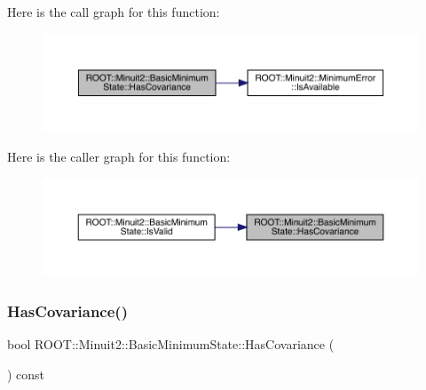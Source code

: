 Here is the call graph for this function\+:
\nopagebreak
\begin{figure}[H]
\begin{center}
\leavevmode
\includegraphics[width=350pt]{d0/db1/classROOT_1_1Minuit2_1_1BasicMinimumState_a9d43155058c576759d062561d77b3e1d_cgraph}
\end{center}
\end{figure}
Here is the caller graph for this function\+:\nopagebreak
\begin{figure}[H]
\begin{center}
\leavevmode
\includegraphics[width=350pt]{d0/db1/classROOT_1_1Minuit2_1_1BasicMinimumState_a9d43155058c576759d062561d77b3e1d_icgraph}
\end{center}
\end{figure}
\mbox{\label{classROOT_1_1Minuit2_1_1BasicMinimumState_a9d43155058c576759d062561d77b3e1d}} 
\subsubsection{\texorpdfstring{HasCovariance()}{HasCovariance()}\hspace{0.1cm}{\footnotesize\ttfamily [2/2]}}
{\footnotesize\ttfamily bool R\+O\+O\+T\+::\+Minuit2\+::\+Basic\+Minimum\+State\+::\+Has\+Covariance (\begin{DoxyParamCaption}{ }\end{DoxyParamCaption}) const\hspace{0.3cm}{\ttfamily [inline]}}

